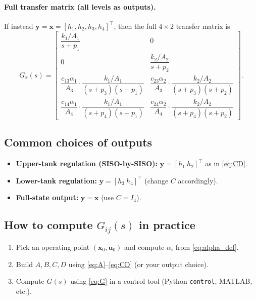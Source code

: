 \documentclass[11pt]{article}
\begin{document}
\paragraph{Full transfer matrix (all levels as outputs).}
If instead \(\bm{y}=\bm{x}=[h_1,h_2,h_3,h_4]^\top\), then the full \(4\times 2\) transfer matrix is
\[
G_x(s)=
\begin{bmatrix}
\dfrac{k_1/A_1}{s+p_1} & 0\\[10pt]
0 & \dfrac{k_2/A_2}{s+p_2}\\[10pt]
\dfrac{c_{13}\alpha_1}{A_3}\cdot\dfrac{k_1/A_1}{(s+p_3)(s+p_1)} &
\dfrac{c_{23}\alpha_2}{A_3}\cdot\dfrac{k_2/A_2}{(s+p_3)(s+p_2)}\\[12pt]
\dfrac{c_{14}\alpha_1}{A_4}\cdot\dfrac{k_1/A_1}{(s+p_4)(s+p_1)} &
\dfrac{c_{24}\alpha_2}{A_4}\cdot\dfrac{k_2/A_2}{(s+p_4)(s+p_2)}
\end{bmatrix}.
\]

\subsection{Common choices of outputs}
\begin{itemize}
  \item \textbf{Upper-tank regulation (SISO-by-SISO):} \(\bm{y}=[h_1\ h_2]^\top\) as in \eqref{eq:CD}.
  \item \textbf{Lower-tank regulation:} \(\bm{y}=[h_3\ h_4]^\top\) (change \(C\) accordingly).
  \item \textbf{Full-state output:} \(\bm{y}=\bm{x}\) (use \(C=I_4\)).
\end{itemize}

\subsection{How to compute \texorpdfstring{$G_{ij}(s)$}{G\_ij(s)} in practice}
\begin{enumerate}
  \item Pick an operating point \((\bm{x}_0,\bm{u}_0)\) and compute \(\alpha_i\) from \eqref{eq:alpha_def}.
  \item Build \(A,B,C,D\) using \eqref{eq:A}--\eqref{eq:CD} (or your output choice).
  \item Compute \(G(s)\) using \eqref{eq:G} in a control tool (Python \texttt{control}, MATLAB, etc.).
\end{enumerate}
\end{document}
